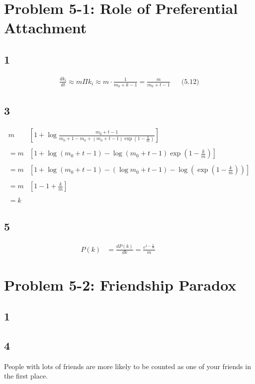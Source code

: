 \documentclass {article}
\begin{document}
\section*{Problem 5-1: Role of Preferential Attachment}

\subsection*{1}
\begin{align*}
 \frac{dk_{i}}{dt} \approx 
 m \Pi k_{i} \approx 
 m \cdot \frac{1}{m_0 + k-1} = 
 \frac{m}{m_0 + t -1}&&   \text{(5.12)}
\end{align*}

\subsection*{3}
\begin{align*}
  m &\left[ 1 + \log  \frac{m_0 + t - 1}{m_0 + 1 - m_0 + (m_0 + t - 1)\exp \left( 1 - \frac{k}{m} \right)}  \right]  \\ \\
  = m &\left[ 1 + \log( m_0 + t - 1) - \log (m_0 + t - 1) \exp \left( 1 - \frac{k}{m}\right) \right] \\ \\
  = m &\left[ 1 + \log(m_0 + t - 1) - (\log m_0 + t - 1)  - \log \left( \exp \left( 1 - \frac{k}{m} \right) \right) \right] \\ \\
  = m &\left[ 1 - 1 + \frac{k}{m} \right] \\ \\
  = k   
\end{align*}

\subsection*{5}
\begin{align*}
 P(k) & = \frac{dP(k)}{dk} = \frac{e^{1 - \frac{k}{m}}}{m} &&&&
\end{align*}

\newpage
\section*{Problem 5-2: Friendship Paradox}
\subsection*{1}
\subsection*{4}
People with lots of friends are more likely to be counted as one of your friends in the first place.
\end{document}

